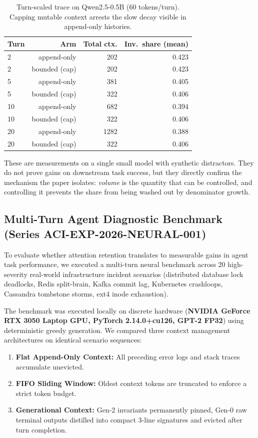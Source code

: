 ﻿\documentclass[11pt,a4paper]{article}
\theoremstyle{plain}
\theoremstyle{definition}
\theoremstyle{remark}
\begin{document}
\begin{table}[ht]
\centering
\small
\begin{tabular}{lrrr}
\toprule
\textbf{Turn} & \textbf{Arm} & \textbf{Total ctx.} & \textbf{Inv.\ share (mean)} \\
\midrule
2  & append-only & 202 & 0.423 \\
2  & bounded (cap) & 202 & 0.423 \\
5  & append-only & 381 & 0.405 \\
5  & bounded (cap) & 322 & 0.406 \\
10 & append-only & 682 & 0.394 \\
10 & bounded (cap) & 322 & 0.406 \\
20 & append-only & 1282& 0.388 \\
20 & bounded (cap) & 322 & 0.406 \\
\bottomrule
\end{tabular}
\caption{Turn-scaled trace on Qwen2.5-0.5B (60 tokens/turn). Capping mutable
context arrests the slow decay visible in append-only histories.}
\label{tab:liveturns}
\end{table}

These are measurements on a single small model with synthetic distractors.
They do not prove gains on downstream task success, but they directly confirm
the mechanism the paper isolates: \emph{volume} is the quantity that can be
controlled, and controlling it prevents the share from being washed out by
denominator growth.

\subsection{Multi-Turn Agent Diagnostic Benchmark (Series ACI-EXP-2026-NEURAL-001)}
\label{subsec:neural_bench}

To evaluate whether attention retention translates to measurable gains in agent task performance, we executed a multi-turn neural benchmark across 20 high-severity real-world infrastructure incident scenarios (distributed database lock deadlocks, Redis split-brain, Kafka commit lag, Kubernetes crashloops, Cassandra tombstone storms, ext4 inode exhaustion).

The benchmark was executed locally on discrete hardware (\textbf{NVIDIA GeForce RTX 3050 Laptop GPU, PyTorch 2.14.0+cu126, GPT-2 FP32}) using deterministic greedy generation. We compared three context management architectures on identical scenario sequences:
\begin{enumerate}[label=(\alph*)]
  \item \textbf{Flat Append-Only Context:} All preceding error logs and stack traces accumulate unevicted.
  \item \textbf{FIFO Sliding Window:} Oldest context tokens are truncated to enforce a strict token budget.
  \item \textbf{Generational Context:} Gen-2 invariants permanently pinned, Gen-0 raw terminal outputs distilled into compact 3-line signatures and evicted after turn completion.
\end{enumerate}
\end{document}
